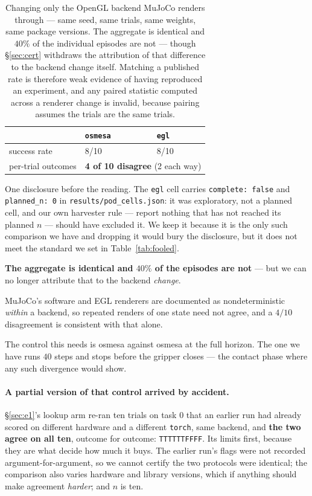 \documentclass[10pt,twocolumn]{article}
\begin{document}
\begin{table}[h]\centering\small
\begin{tabular}{lll}
\toprule
& \texttt{osmesa} & \texttt{egl} \\
\midrule
success rate & 8/10 & 8/10 \\
per-trial outcomes & \multicolumn{2}{l}{\textbf{4 of 10 disagree} (2 each way)} \\
\bottomrule
\end{tabular}
\caption{Changing only the OpenGL backend MuJoCo renders through --- same
seed, same trials, same weights, same package versions. The aggregate is
identical and $40\%$ of the individual episodes are not --- though
\S\ref{sec:cert} withdraws the attribution of that difference to the backend
change itself. Matching a published
rate is therefore weak evidence of having reproduced an experiment, and any
paired statistic computed across a renderer change is invalid, because pairing
assumes the trials are the same trials.}
\label{tab:renderer}
\end{table}

\noindent One disclosure before the reading. The \texttt{egl} cell carries
\texttt{complete: false} and \texttt{planned\_n: 0} in
\texttt{results/pod\_cells.json}: it was exploratory, not a planned cell, and
our own harvester rule --- report nothing that has not reached its planned $n$
--- should have excluded it. We keep it because it is the only such comparison
we have and dropping it would bury the disclosure, but it does not meet the
standard we set in Table~\ref{tab:fooled}.

\textbf{The aggregate is identical and $40\%$ of the episodes are
not} --- but we can no longer attribute that to the backend \emph{change}.

MuJoCo's software and EGL renderers are documented as nondeterministic
\emph{within} a backend, so repeated renders of one state need not agree, and a
$4/10$ disagreement is consistent with that alone.

The control this needs is osmesa against osmesa at the full horizon. The one we
have runs $40$ steps and stops before the gripper closes --- the contact phase
where any such divergence would show.

\paragraph{A partial version of that control arrived by accident.}
\S\ref{sec:e1}'s lookup arm re-ran ten trials on task $0$ that an earlier run
had already scored on different hardware and a different \texttt{torch}, same
backend, and \textbf{the two agree on all ten}, outcome for outcome:
\texttt{TTTTTTFFFF}. Its limits first, because they are what decide how much it
buys. The earlier run's flags were not recorded argument-for-argument, so we
cannot certify the two protocols were identical; the comparison also varies
hardware and library versions, which if anything should make agreement
\emph{harder}; and $n$ is ten.
\end{document}
